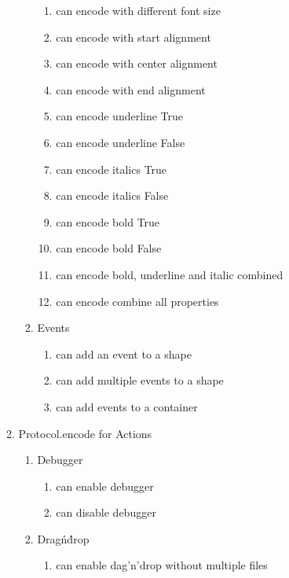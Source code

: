 \begin{enumerate}[{T}1]
\begin{enumerate}
\begin{enumerate}
\begin{enumerate}
            	\item can encode with different font size
            	\item can encode with start alignment
            	\item can encode with center alignment
            	\item can encode with end alignment
            	\item can encode underline True
            	\item can encode underline False
            	\item can encode italics True
            	\item can encode italics False
            	\item can encode bold True
            	\item can encode bold False
            	\item can encode bold, underline and italic combined
            	\item can encode combine all properties
            \end{enumerate}
	        \item Events
	        \begin{enumerate}
            	\item can add an event to a shape
            	\item can add multiple events to a shape
            	\item can add events to a container
            \end{enumerate}
        \end{enumerate}
	    \item Protocol.encode for Actions
	    \begin{enumerate}
	        \item Debugger
	        \begin{enumerate}
            	\item can enable debugger
            	\item can disable debugger
            \end{enumerate}
            \item Drag\'n\'drop
	        \begin{enumerate}
            	\item can enable dag'n'drop without multiple files

\end{enumerate}
\end{enumerate}
\end{enumerate}
\end{enumerate}

